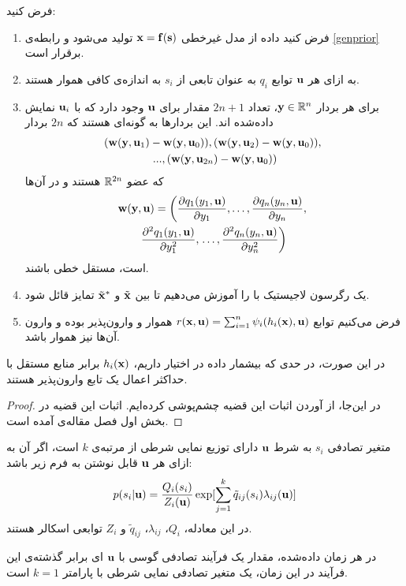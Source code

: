 \documentclass[oneside]{thesis}
\begin{document}
\begin{theorem}
	فرض کنید:
	\begin{enumerate}
		\item 
		فرض کنید داده از مدل غیرخطی
		$\mathbf{x} = \mathbf{f}(\mathbf{s})$
		تولید می‌شود و رابطه‌ی 
		\eqref{genprior}
		برقرار است.
		\item
		به ازای هر 
		$\mathbf{u}$
		توابع 
		$q_i$
		به عنوان تابعی از 
		$s_i$
		به اندازه‌ی کافی هموار هستند.
		\item
		برای هر بردار 
		$\mathbf{y} \in \mathbb{R}^n$،
		تعداد 
		$2n+1$
		مقدار برای 
		$\mathbf{u}$
		وجود دارد که با 
		$\mathbf{u}_i$
		نمایش داده‌شده اند. این بردار‌ها به گونه‌ای هستند که
		$2n$
		بردار
		\begin{multline}
		\left(\mathbf{w}(\mathbf{y},\mathbf{u}_1)-\mathbf{w}(\mathbf{y},\mathbf{u}_0)),(\mathbf{w}(\mathbf{y},\mathbf{u}_2)-\mathbf{w}(\mathbf{y},\mathbf{u}_0)),\right. \\ \left. ...,(\mathbf{w}(\mathbf{y},\mathbf{u}_{2n})-\mathbf{w}(\mathbf{y},\mathbf{u}_0)\right)
		\end{multline}
		که عضو
		$\mathbb{R}^{2n}$
		هستند و در آن‌ها 
		\begin{multline} \label{wdef}
		\mathbf{w}(\mathbf{y},\mathbf{u})=\left(\frac{\partial q_1(y_1,\mathbf{u})}{ \partial y_1},\ldots,\frac{\partial q_n(y_n,\mathbf{u})}{ \partial y_n},  \right. \\ \frac{\partial^2 q_1(y_1,\mathbf{u})}{ \partial y_1^2},   \left. \ldots,\frac{\partial^2 q_n(y_n,\mathbf{u})}{ \partial y_n^2}\right)
		\end{multline}
		است، مستقل خطی باشند.
		\item 
		یک رگرسون لاجیستیک
		با  
		را آموزش می‌دهیم تا بین 
		$\tilde{\mathbf{x}}$
		و
		$\tilde{\mathbf{x}}^*$
		تمایز قائل شود.
		\item
		فرض می‌کنیم توابع 
		$
		r(\mathbf{x},\mathbf{u})= \sum_{i=1}^n \psi_i(h_i(\mathbf{x}),\mathbf{u})
		$
		هموار و وارون‌پذیر بوده و وارون آن‌ها نیز هموار باشد.
	\end{enumerate}
	در این صورت، در حدی که بیشمار داده در اختیار داریم، 
	$h_i(\mathbf{x})$
	برابر منابع مستقل با حداکثر اعمال یک تابع  وارون‌پذیر هستند.
	\label{newthm}
\end{theorem}
\begin{proof}
	در این‌جا، از آوردن اثبات این قضیه چشم‌پوشی کرده‌ایم. اثبات این قضیه در بخش اول فصل
	مقاله‌ی 
	\cite{newHyva}
	آمده است.
\end{proof}

\begin{definition}
	متغیر تصادفی 
	$s_i$
	به شرط 
	$\mathbf{u}$
	دارای توزیع نمایی شرطی از مرتبه‌ی 
	$k$
	است، اگر 
	آن به ازای هر 
	$\mathbf{u}$
	قابل نوشتن به فرم زیر باشد:
	\begin{equation} \label{expdef}
	p(s_i|\mathbf{u})=\frac{Q_i(s_i)}{Z_i(\mathbf{u})}\exp[\sum_{j=1}^k \tilde{q}_{ij}(s_i)\lambda_{ij}(\mathbf{u})]
	\end{equation}
	در این معادله،
	$Q_i$،
	$\lambda_{ij}$،
	$\tilde{q}_{ij}$
	و 
	$Z_i$
	توابعی اسکالر هستند.
\end{definition}
\begin{example}
	در هر زمان داده‌شده، مقدار یک فرآیند تصادفی گوسی با 
	$\mathbf{u}$
	ای برابر گذشته‌ی این فرآیند در این زمان، یک متغیر تصادفی نمایی شرطی با پارامتر 
	$k = 1$
	است.
\end{example}
\end{document}
